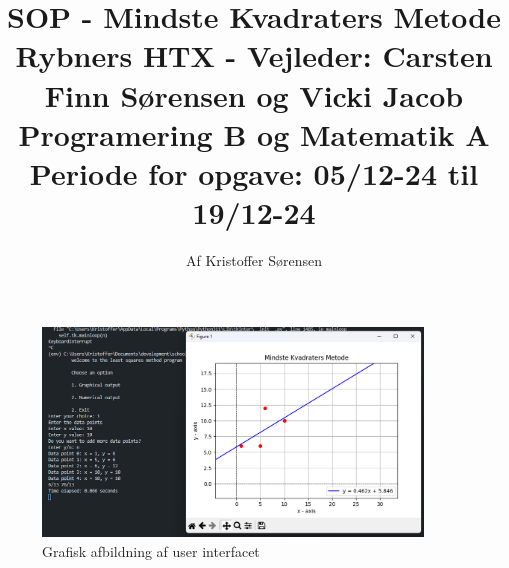 \title{
    SOP - Mindste Kvadraters Metode \\ 
    \large{Rybners HTX - Vejleder: Carsten Finn Sørensen og Vicki Jacob} \\
    \small{Programering B og Matematik A}\\
    \small{Periode for opgave: 05/12-24 til 19/12-24}
}
\author{Af Kristoffer Sørensen}
\thispagestyle{empty}
\maketitle
\begin{figure}[h!]
    \centering
    \includegraphics[width=0.9\textwidth]{figures/forsideimg.png}
    \caption{Grafisk afbildning af user interfacet}
    \label{fig:userinterface}
\end{figure}
\newpage